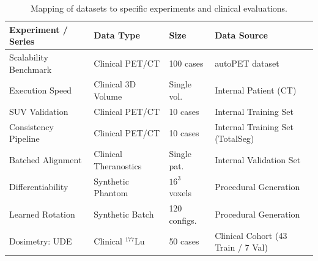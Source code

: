 \documentclass[10pt,letterpaper]{article}
\begin{document}
\begin{table}[H]
\centering
\caption{Mapping of datasets to specific experiments and clinical evaluations.}
\label{tab:dataset_mapping}
\renewcommand{\arraystretch}{1.2}
\begin{tabular}{|p{}|p{}|p{}|p{}|}
\hline
\textbf{Experiment / Series} & \textbf{Data Type} & \textbf{Size} & \textbf{Data Source} \\
\hline
Scalability Benchmark & Clinical PET/CT & 100 cases & autoPET dataset \cite{Dexl_2025} \\
\hline
Execution Speed & Clinical 3D Volume & Single vol. & Internal Patient (CT) \\
\hline
SUV Validation & Clinical PET/CT & 10 cases & Internal Training Set \\
\hline
Consistency Pipeline & Clinical PET/CT & 10 cases & Internal Training Set (TotalSeg) \\
\hline
Batched Alignment & Clinical Theranostics & Single pat. & Internal Validation Set \\
\hline
Differentiability & Synthetic Phantom & $16^3$ voxels & Procedural Generation \\
\hline
Learned Rotation & Synthetic Batch & 120 configs. & Procedural Generation \\
\hline
Dosimetry: UDE & Clinical $^{177}\mathrm{Lu}$ & 50 cases & Clinical Cohort (43 Train / 7 Val) \\
\hline
\end{tabular}
\end{table}
\end{document}
